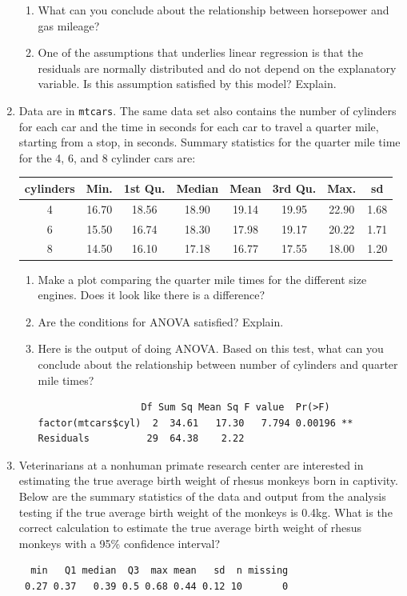 \documentclass[12pt,fullpage]{amsart}
\begin{document}
\begin{enumerate}
\begin{enumerate}
  \item What can you conclude about the relationship between horsepower and gas mileage?

\item One of the assumptions that underlies linear regression is that the residuals are normally distributed and do not depend on the explanatory variable. Is this assumption satisfied by this model? Explain.

  \end{enumerate}


\item Data are in \texttt{mtcars}. The same data set also contains the number of cylinders for each car and the time in seconds for each car to travel a quarter mile, starting from a stop, in seconds.  Summary statistics for the quarter mile time for the 4, 6, and 8 cylinder cars are:
\bigskip


\begin{tabular}{c|ccccccc}
cylinders & Min. & 1st Qu. & Median & Mean & 3rd Qu. & Max. & sd\\
\hline
4 & 16.70 & 18.56 & 18.90 & 19.14 & 19.95 & 22.90 & 1.68\\
6 & 15.50 & 16.74 & 18.30 & 17.98 & 19.17 & 20.22 & 1.71\\
8 & 14.50 & 16.10 & 17.18 & 16.77 & 17.55 & 18.00 & 1.20
\end{tabular}

  \begin{enumerate}
  \item Make a plot comparing the quarter mile times for the different size engines. Does it look like there is a difference?
  \item Are the conditions for ANOVA satisfied? Explain.

  \item Here is the output of doing ANOVA. Based on this test, what can you conclude about the
    relationship between number of cylinders and quarter mile times? 
    \begin{verbatim}
                  Df Sum Sq Mean Sq F value  Pr(>F)   
factor(mtcars$cyl)  2  34.61   17.30   7.794 0.00196 **
Residuals          29  64.38    2.22
\end{verbatim}

  \end{enumerate}


\item Veterinarians at a nonhuman primate research center are interested in estimating the true average birth weight of rhesus monkeys born in captivity.  Below are the summary statistics of the data and output from the analysis testing if the true average birth weight of the monkeys is 0.4kg.  What is the correct calculation to estimate the true average birth weight of rhesus monkeys with a 95\% confidence interval?
\begin{verbatim}
  min   Q1 median  Q3  max mean   sd  n missing
 0.27 0.37   0.39 0.5 0.68 0.44 0.12 10       0


\end{verbatim}
\end{enumerate}
\end{document}
